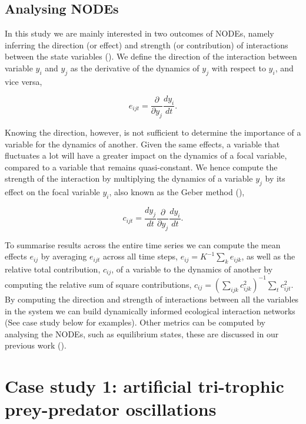 \documentclass[11pt, oneside]{article}
\begin{document}
\subsection{Analysing NODEs}

In this study we are mainly interested in two outcomes of NODEs, namely inferring the direction (or effect) and strength (or contribution) of interactions between the state variables (\cite{Bonnaffe2021a}).
We define the direction of the interaction between variable $y_i$ and $y_j$ as the derivative of the dynamics of $y_j$ with respect to $y_i$, and vice versa, 

\vspace{-0.5cm}
\begin{equation}
    e_{ijt} = \frac{\partial}{\partial y_j} \frac{dy_i}{dt}.
\end{equation}

Knowing the direction, however, is not sufficient to determine the importance of a variable for the dynamics of another. 
Given the same effects, a variable that fluctuates a lot will have a greater impact on the dynamics of a focal variable, compared to a variable that remains quasi-constant.
We hence compute the strength of the interaction by multiplying the dynamics of a variable $y_j$ by its effect on the focal variable $y_i$, also known as the Geber method (\cite{Hairston2005}),

\vspace{-0.5cm}
\begin{equation}
    c_{ijt} = \frac{dy_j}{dt} \frac{\partial}{\partial y_j} \frac{dy_i}{dt}.
\end{equation}

To summarise results across the entire time series we can compute the mean effects $e_{ij}$ by averaging $e_{ijt}$ across all time steps, $e_{ij} = K^{-1} \sum_k e_{ijk}$, as well as the relative total contribution, $c_{ij}$, of a variable to the dynamics of another by computing the relative sum of square contributions, $c_{ij} = \left( \sum_{ijk} c_{ijk}^{2} \right)^{-1} \sum_t c_{ijt}^2$. 
By computing the direction and strength of interactions between all the variables in the system we can build dynamically informed ecological interaction networks (See case study below for examples).
Other metrics can be computed by analysing the NODEs, such as equilibrium states, these are discussed in our previous work (\cite{Bonnaffe2021a}). 

\section{Case study 1: artificial tri-trophic prey-predator oscillations}
\end{document}
